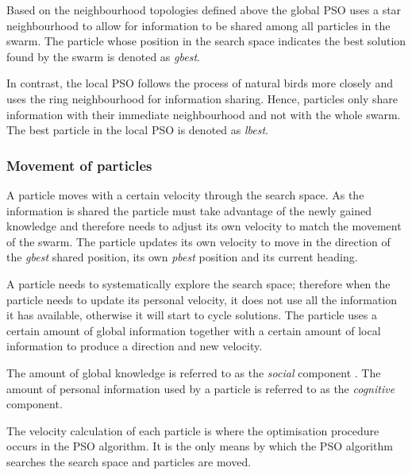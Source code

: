 Based on the neighbourhood topologies defined above the global \gls{PSO} uses a star neighbourhood to allow for information to be shared among all particles in the swarm. The particle whose position in the search space indicates the best solution found by the swarm is denoted as \emph{gbest}\cite{SOSwarm, FundamentalSwarm, CompuIntelligenceIntro}. 

In contrast, the local \gls{PSO} follows the process of natural birds more closely and uses the ring neighbourhood for information sharing\cite{SOSwarm, FundamentalSwarm, CompuIntelligenceIntro}. Hence, particles only share information with their immediate neighbourhood and not with the whole swarm. The best particle in the local \gls{PSO} is denoted as \emph{lbest}\cite{SOSwarm, FundamentalSwarm, CompuIntelligenceIntro}.

\subsubsection{Movement of particles}
\label{sec:particleVelocity}
A particle moves with a certain velocity through the search space. As the information is shared the particle must take advantage of the newly gained knowledge and therefore needs to adjust its own velocity to match the movement of the swarm. The particle updates its own velocity to move in the direction of the \emph{gbest} shared position, its own \emph{pbest} position and its current heading.

A particle needs to systematically explore the search space; therefore when the particle needs to update its personal velocity, it does not use all the information it has available, otherwise it will start to cycle solutions. The particle uses a certain amount of global information together with a certain amount of local information to produce a direction and new velocity\cite{FundamentalSwarm,CompuIntelligenceIntro,PSOSelfHierarch,SOSwarm}. 

The amount of global knowledge is referred to as the \emph{social} \label{def:socialcomponent} component \cite{FundamentalSwarm,CompuIntelligenceIntro,PSOSelfHierarch,SOSwarm}. The amount of personal information used by a particle is referred to as the \emph{cognitive} \label{def:cognitivecomponent} component\cite{FundamentalSwarm,CompuIntelligenceIntro,PSOSelfHierarch,SOSwarm}.

The velocity calculation of each particle is where the optimisation procedure occurs in the \gls{PSO} algorithm. It is the only means by which the \gls{PSO} algorithm searches the search space and particles are moved\cite{CompuIntelligenceIntro}.

